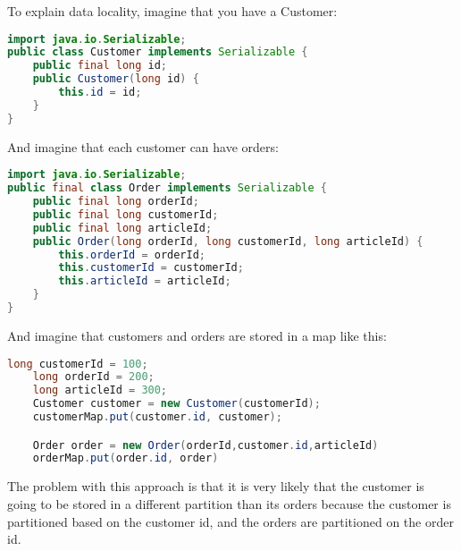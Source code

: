 To explain data locality, imagine that you have a Customer:
\begin{lstlisting}[language=java]
import java.io.Serializable;
public class Customer implements Serializable {
    public final long id;
    public Customer(long id) {
        this.id = id;
    }
}
\end{lstlisting}
And imagine that each customer can have orders:
\begin{lstlisting}[language=java]
import java.io.Serializable;
public final class Order implements Serializable {
    public final long orderId;
    public final long customerId;
    public final long articleId;
    public Order(long orderId, long customerId, long articleId) {
        this.orderId = orderId;
        this.customerId = customerId;
        this.articleId = articleId;
    }
}
\end{lstlisting}
And imagine that customers and orders are stored in a map like this:
\begin{lstlisting}[language=java]
    long customerId = 100;
    long orderId = 200;
    long articleId = 300;
    Customer customer = new Customer(customerId);
    customerMap.put(customer.id, customer);

    Order order = new Order(orderId,customer.id,articleId)
	orderMap.put(order.id, order)
\end{lstlisting}
The problem with this approach is that it is very likely that the customer is going to be stored in a different partition than its orders because the customer is partitioned based on the customer id, and the orders are partitioned on the order id.

